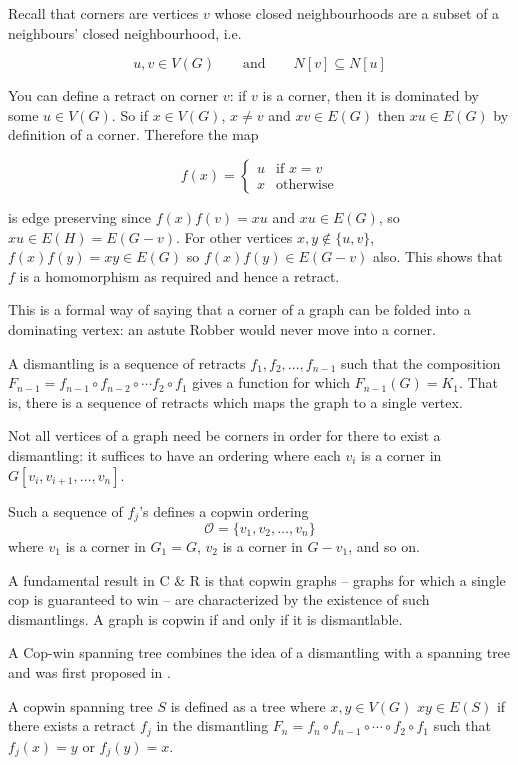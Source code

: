 Recall that corners are vertices $v$ whose closed neighbourhoods
are a subset of a neighbours' closed neighbourhood, i.e.

\[u,v\in V(G) \qquad \text{and} \qquad N[v] \subseteq N[u] \]

You can define a retract on corner $v$: if $v$ is a corner, then it is
dominated by some $u \in V(G)$. So if $x \in V(G)$, $x \neq v$ and
$xv \in E(G)$ then $xu \in E(G)$ by definition of a corner. Therefore the map

\[ f(x) = \begin{cases}
u & \text{if } x = v \\
x & \text{otherwise}
\end{cases} \]

is edge preserving since $f(x)f(v) = xu$ and $xu \in E(G)$, so $xu \in E(H) = E(G - v)$.
For other vertices $x,y \not\in \{u,v\}$, $f(x)f(y) = xy \in E(G)$ so $f(x)f(y) \in E(G- v)$ also.
This shows that $f$ is a homomorphism as required and hence a retract.

This is a formal way of saying that a corner of a graph can be folded into a
dominating vertex: an astute Robber would never move into a corner.

A dismantling is a sequence of retracts $f_1, f_2, \dots, f_{n-1}$ such that the
composition $F_{n-1} = f_{n-1} \circ f_{n-2} \circ \cdots f_2 \circ f_1$ gives a
function for which $F_{n-1} (G) = K_1$. That is, there is a sequence of retracts
which maps the graph to a single vertex.

Not all vertices of a graph need be corners in order for there
to exist a dismantling: it suffices to have an ordering where each $v_i$ is a corner in
$G[v_i, v_{i+1}, \dots, v_n]$.

Such a sequence of $f_j$'s defines a copwin ordering
\[ \mathcal{O} = \{ v_1, v_2, \dots, v_n\} \]
 where $v_1$ is a corner in $G_1 = G$, $v_2$ is a corner in $G - v_1$, and so on.

A fundamental result in C \& R is that copwin graphs -- graphs for which a single
cop is guaranteed to win --  are characterized by the existence of such dismantlings.
A graph is copwin if and only if it is dismantlable.


A Cop-win spanning tree combines the idea of a dismantling with a spanning tree
and was first proposed in \cite{clarke2002constrained}.

A copwin spanning tree $S$ is defined as a tree where $x,y\in V(G)$
$xy \in E(S)$ if there exists a retract $f_j$ in the dismantling
$F_n = f_{n} \circ f_{n-1} \circ \cdots \circ f_{2} \circ f_1$
such that $f_j (x) = y$ or $f_j (y) = x$.

